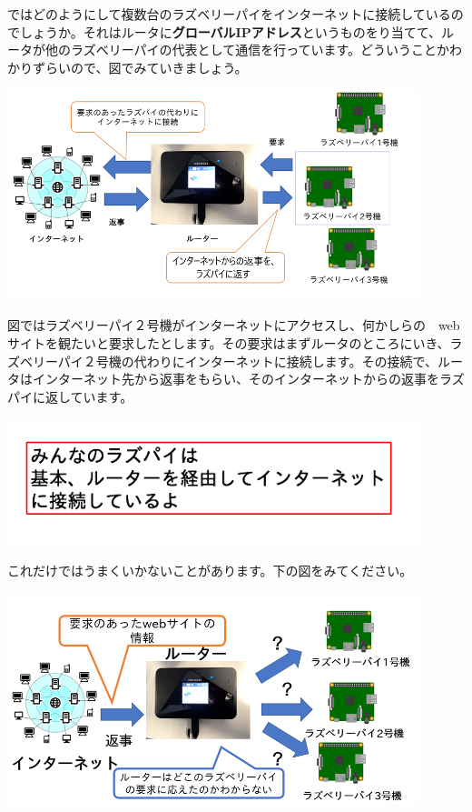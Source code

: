\documentclass[a4paper,12pt,dvipdfmx]{jarticle}
\begin{document}
\bigskip

ではどのようにして複数台のラズベリーパイをインターネットに接続しているのでしょうか。それはルータに\textbf{グローバルIPアドレス}というものをり当てて、ルータが他のラズベリーパイの代表として通信を行っています。どういうことかわかりずらいので、図でみていきましょう。



\centering
\includegraphics[width=0.9\textwidth]{ome7-img013.png}
\flushleft


\bigskip

図ではラズベリーパイ２号機がインターネットにアクセスし、何かしらの　webサイトを観たいと要求したとします。その要求はまずルータのところにいき、ラズベリーパイ２号機の代わりにインターネットに接続します。その接続で、ルータはインターネット先から返事をもらい、そのインターネットからの返事をラズパイに返しています。

\centering
\includegraphics[width=0.9\textwidth]{ome7-img014.png}
\flushleft


\bigskip

\clearpage
これだけではうまくいかないことがあります。下の図をみてください。



\centering
\includegraphics[width=0.9\textwidth]{ome7-img015.png}
\flushleft
\end{document}
